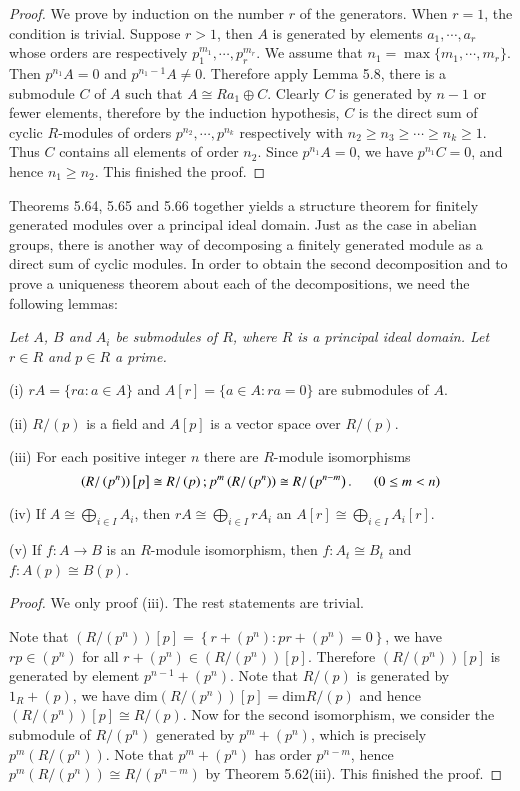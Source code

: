 \begin{proof}
We prove by induction on the number $r$ of the generators. When $r=1$, the condition is trivial. Suppose $r>1$, then $A$ is generated by elements $a_1,\cdots,a_r$ whose orders are respectively $p_1^{m_1},\cdots,p_r^{m_r}$. We assume that $n_1=\max\{m_1,\cdots,m_r\}$. Then $p^{n_1}A=0$ and $p^{n_1-1}A\ne 0$. Therefore apply Lemma 5.8, there is a submodule $C$ of $A$ such that $A\cong Ra_1\oplus C$. Clearly $C$ is generated by $n-1$ or fewer elements, therefore by the induction hypothesis, $C$ is the direct sum of cyclic $R$-modules of orders $p^{n_2},\cdots,p^{n_k}$ respectively with $n_2\ge n_3\ge\cdots\ge n_k\ge 1$. Thus $C$ contains all elements of order $n_2$. Since $p^{n_1}A=0$, we have $p^{n_1}C=0$, and hence $n_1\ge n_2$. This finished the proof.
\end{proof}
Theorems 5.64, 5.65 and 5.66 together yields a structure theorem for finitely generated modules over a principal ideal domain. Just as the case in abelian groups, there is another way of decomposing a finitely generated module as a direct sum of cyclic modules. In order to obtain the second decomposition and to prove a uniqueness theorem about each of the decompositions, we need the following lemmas:
\begin{lemma}\em
Let $A$, $B$ and $A_i$ be submodules of $R$, where $R$ is a principal ideal domain. Let $r\in R$ and $p\in R$ a prime.\par
(i) $rA=\{ra:a\in A\}$ and $A[r]=\{a\in A:ra=0\}$ are submodules of $A$.\par
(ii) $R/(p)$ is a field and $A[p]$ is a vector space over $R/(p)$.\par
(iii) For each positive integer $n$ there are $R$-module isomorphisms 
$$
\left( R/\left( p^n \right) \right) \left[ p \right] \cong R/\left( p \right) ;p^m\left( R/\left( p^n \right) \right) \cong R/\left( p^{n-m} \right) .\hspace{0.5cm}\left( 0\le m<n \right) 
$$\par
(iv) If $A\cong\bigoplus_{i\in I}A_i$, then $rA\cong\bigoplus_{i\in I}rA_i$ an $A[r]\cong\bigoplus_{i\in I}A_i[r]$.\par
(v) If $f:A\to B$ is an $R$-module isomorphism, then $f:A_t\cong B_t$ and $f:A(p)\cong B(p)$.
\end{lemma}
\begin{proof}
We only proof (iii). The rest statements are trivial.\par
Note that $\left( R/\left( p^n \right) \right) \left[ p \right] =\left\{ r+\left( p^n \right) :pr+\left( p^n \right) =0 \right\} $, we have $rp\in (p^n)$ for all $r+(p^n)\in (R/(p^n))[p]$. Therefore $(R/(p^n))[p]$ is generated by element $p^{n-1}+(p^n)$. Note that $R/(p)$ is generated by $1_R+(p)$, we have $\mathrm{dim}\left( R/\left( p^n \right) \right) \left[ p \right] =\mathrm{dim}R/\left( p \right) $ and hence $\left( R/\left( p^n \right) \right) \left[ p \right] \cong R/\left( p \right) $. Now for the second isomorphism, we consider the submodule of $R/(p^n)$ generated by $p^m+(p^n)$, which is precisely $p^m(R/(p^n))$. Note that $p^m+(p^n)$ has order $p^{n-m}$, hence $p^m(R/(p^n))\cong R/(p^{n-m})$ by Theorem 5.62(iii). This finished the proof.
\end{proof}
